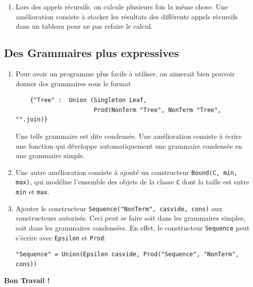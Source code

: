 \documentclass[11pt]{article}
\newcounter{asuivre}
\newenvironment{asks}{\begin{enumerate}\setcounter{enumi}{\theasuivre}}%
                       {\setcounter{asuivre}{\theenumi}\end{enumerate}}
\begin{document}
\begin{asks}
\item Lors des appels récursifs, on calcule plusieurs fois la même chose. Une
  amélioration consiste à stocker les résultats des différents appels
  récursifs dans un tableau pour ne pas refaire le calcul.
\end{asks}

\subsection{Des Grammaires plus expressives}

\begin{asks}
\item Pour avoir un programme plus facile à utiliser, on aimerait bien pouvoir
  donner des grammaires sous le format
\begin{verbatim}
    {"Tree" :  Union (Singleton Leaf,
                      Prod(NonTerm "Tree", NonTerm "Tree", "".join)}
\end{verbatim}
  Une telle grammaire est dite condensée. Une amélioration consiste à écrire
  une fonction qui développe automatiquement une grammaire
  condensée en une grammaire simple.
\item Une autre amélioration consiste à ajouté un constructeur
  \texttt{Bound(C, min, max)}, qui modélise l'ensemble des objets de la classe
  \texttt{C} dont la taille est entre \texttt{min} et \texttt{max}.
\item Ajouter le constructeur \texttt{Sequence("NonTerm", casvide, cons)} aux
  constructeurs autorisés. Ceci peut se faire soit dans les grammaires
  simples, soit dans les grammaires condensées.  En effet, le constructeur
  \texttt{Sequence} peut s'écrire avec \texttt{Epsilon} et \texttt{Prod}:
\begin{verbatim}
"Sequence" = Union(Epsilon casvide, Prod("Sequence", "NonTerm", cons))
\end{verbatim}
\end{asks}

\bigskip
\bigskip
\bigskip
\hskip10cm{\Large\bf Bon Travail !}
\end{document}

